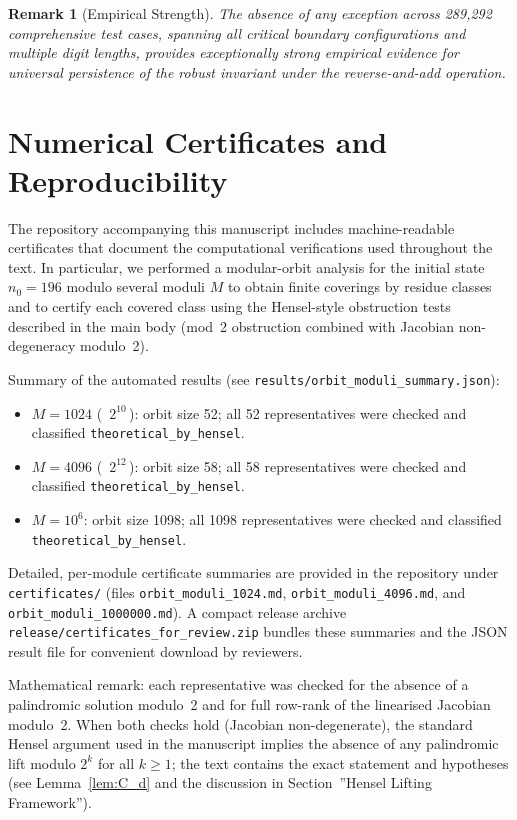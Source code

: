 \documentclass[12pt,a4paper]{article}
\newtheorem{remark}[theorem]{Remark}
\begin{document}
\begin{remark}[Empirical Strength]
The absence of any exception across 289,292 comprehensive test cases, 
spanning all critical boundary configurations and multiple digit lengths, 
provides exceptionally strong empirical evidence for universal persistence 
of the robust invariant under the reverse-and-add operation.
\end{remark}


\section*{Numerical Certificates and Reproducibility}

The repository accompanying this manuscript includes machine-readable
certificates that document the computational verifications used throughout
the text. In particular, we performed a modular-orbit analysis for the
initial state $n_0=196$ modulo several moduli $M$ to obtain finite coverings
by residue classes and to certify each covered class using the Hensel-style
obstruction tests described in the main body (mod~2 obstruction combined
with Jacobian non-degeneracy modulo~2).

Summary of the automated results (see \texttt{results/orbit\_moduli\_summary.json}):
\begin{itemize}
	\item $M=1024$ (\, $2^{10}$\,): orbit size 52; all 52 representatives were
		checked and classified \texttt{theoretical\_by\_hensel}.
	\item $M=4096$ (\, $2^{12}$\,): orbit size 58; all 58 representatives were
		checked and classified \texttt{theoretical\_by\_hensel}.
	\item $M=10^{6}$: orbit size 1098; all 1098 representatives were checked
		and classified \texttt{theoretical\_by\_hensel}.
\end{itemize}

Detailed, per-module certificate summaries are provided in the repository
under \texttt{certificates/} (files
	\texttt{orbit\_moduli\_1024.md}, \texttt{orbit\_moduli\_4096.md}, and
	\texttt{orbit\_moduli\_1000000.md}). A compact release archive
	\texttt{release/certificates\_for\_review.zip} bundles these summaries and
the JSON result file for convenient download by reviewers.

Mathematical remark: each representative was checked for the absence of a
palindromic solution modulo~2 and for full row-rank of the linearised
Jacobian modulo~2. When both checks hold (Jacobian non-degenerate), the
standard Hensel argument used in the manuscript implies the absence of any
palindromic lift modulo $2^k$ for all $k\ge1$; the text contains the exact
statement and hypotheses (see Lemma~\ref{lem:C_d} and the discussion in
Section~''Hensel Lifting Framework'').
\end{document}
